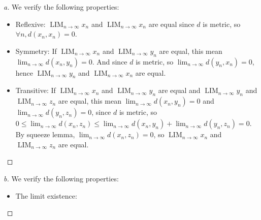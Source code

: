 \begin{proof}[a] 
    We verify the following properties:
    \begin{itemize}
        \item Reflexive: $\operatorname{LIM}_{n\to\infty} x_n$ and $\operatorname{LIM}_{n\to\infty} x_n$ are equal since $d$ is metric, so $\forall n, d(x_n, x_n) = 0$.
        \item Symmetry: If $\operatorname{LIM}_{n\to\infty} x_n$ and $\operatorname{LIM}_{n\to\infty} y_n$ are equal, this mean $\lim_{n\to\infty} d(x_n,y_n) = 0$. And since $d$ is metric, so $\lim_{n\to\infty} d(y_n,x_n) = 0$, hence $\operatorname{LIM}_{n\to\infty} y_n$ and $\operatorname{LIM}_{n\to\infty} x_n$ are equal.
        \item Transitive: If $\operatorname{LIM}_{n\to\infty} x_n$ and $\operatorname{LIM}_{n\to\infty} y_n$ are equal and $\operatorname{LIM}_{n\to\infty} y_n$ and $\operatorname{LIM}_{n\to\infty} z_n$ are equal, this mean $\lim_{n\to\infty} d(x_n,y_n) = 0$ and $\lim_{n\to\infty} d(y_n,z_n) = 0$, since $d$ is metric, so $0 \leq \lim_{n\to\infty} d(x_n,z_n) \leq \lim_{n\to\infty} d(x_n,y_n) + \lim_{n\to\infty} d(y_n,z_n) = 0$. By squeeze lemma, $\lim_{n\to\infty} d(x_n,z_n) = 0$, so  $\operatorname{LIM}_{n\to\infty} x_n$ and $\operatorname{LIM}_{n\to\infty} z_n$ are equal.
    \end{itemize}
\end{proof}

\begin{proof}[b]
    We verify the following properties:
    \begin{itemize}
        \item The limit existence: 
    \end{itemize}
\end{proof}

